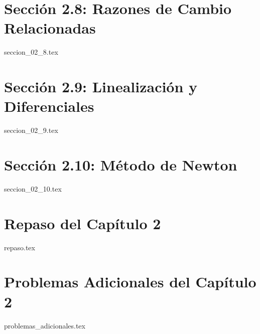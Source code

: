 \section{Sección 2.8: Razones de Cambio Relacionadas}
{seccion_02_8.tex}

\section{Sección 2.9: Linealización y Diferenciales}
{seccion_02_9.tex}

\section{Sección 2.10: Método de Newton}
{seccion_02_10.tex}

\section{Repaso del Capítulo 2}
{repaso.tex}

\section{Problemas Adicionales del Capítulo 2}
{problemas_adicionales.tex}

